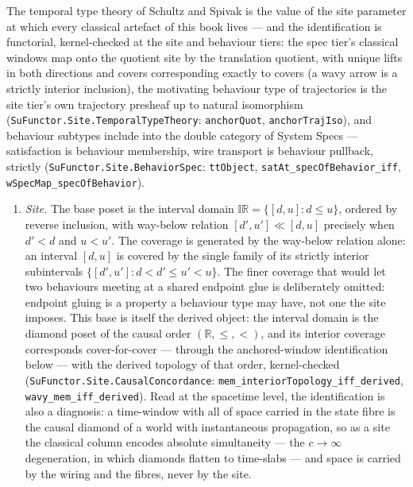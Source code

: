 \begin{remark}
\label{rem:su-classical-site}
The temporal type theory of Schultz and Spivak is the value of the
site parameter at which every classical artefact of this book lives
--- and the identification is functorial, kernel-checked at the site and
behaviour tiers: the spec
tier's classical windows map onto the quotient site by the
translation quotient, with unique lifts in both directions and
covers corresponding exactly to covers (a wavy arrow is a strictly
interior inclusion), the motivating behaviour type of trajectories
is the site tier's own trajectory presheaf up to natural
isomorphism (\texttt{SuFunctor.Site.TemporalTypeTheory}:
\texttt{anchorQuot}, \texttt{anchorTrajIso}), and behaviour
subtypes include into the double category of System Specs ---
satisfaction is behaviour membership, wire transport is behaviour
pullback, strictly (\texttt{SuFunctor.Site.BehaviorSpec}:
\texttt{ttObject}, \texttt{satAt\_specOfBehavior\_iff},
\texttt{wSpecMap\_specOfBehavior}).
\begin{enumerate}
\item \emph{Site.} The base poset is the interval domain
  $\mathbb{IR} = \{[d,u] : d \le u\}$, ordered by reverse inclusion,
  with way-below relation $[d',u'] \ll [d,u]$ precisely when $d' < d$
  and $u < u'$. The coverage is generated by the way-below relation
  alone: an interval $[d,u]$ is covered by the single family of its
  strictly interior subintervals
  $\{[d',u'] : d < d' \le u' < u\}$. The finer coverage that would
  let two behaviours meeting at a shared endpoint glue is deliberately
  omitted: endpoint gluing is a property a behaviour type may have,
  not one the site imposes. This base is itself the derived object:
  the interval domain is the diamond poset of the causal order
  $(\mathbb{R}, \le, <)$, and its interior coverage corresponds
  cover-for-cover --- through the anchored-window identification
  below --- with the derived topology of that order, kernel-checked
  (\texttt{SuFunctor.Site.CausalConcordance}:
  \texttt{mem\_interiorTopology\_iff\_derived},
  \texttt{wavy\_mem\_iff\_derived}). Read at the spacetime level,
  the identification is also a diagnosis: a time-window with all of
  space carried in the state fibre is the causal diamond of a world
  with instantaneous propagation, so as a site the classical column
  encodes absolute simultaneity --- the $c \to \infty$ degeneration,
  in which diamonds flatten to time-slabs --- and space is carried
  by the wiring and the fibres, never by the site.

\end{enumerate}
\end{remark}

